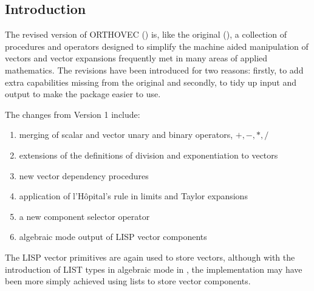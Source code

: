 
\subsection{Introduction}
The revised version of \textsc{ORTHOVEC} (\cite{Eastwood:91}) is, like the
original (\cite{Eastwood:87}), a collection of \REDUCE procedures and
operators designed to simplify the machine aided manipulation of vectors
and vector expansions frequently met in many areas of applied mathematics.
The revisions have been introduced for two reasons: firstly, to add extra
capabilities missing from the original and secondly, to tidy up input and
output to make the package easier to use.

The changes from Version 1 include:
\begin{enumerate}
\item merging of scalar and vector unary and binary operators, $+, - , *, /
$
\item extensions of the definitions of division and exponentiation 
to vectors
\item new vector dependency procedures
\item application of l'H\^opital's rule in limits and Taylor expansions
\item a new component selector operator
\item algebraic mode output of LISP vector components
\end{enumerate}

The LISP vector primitives are again used to store vectors, although 
with the introduction of LIST types in algebraic mode in , the implementation may have been more simply achieved 
using lists to store vector components.

